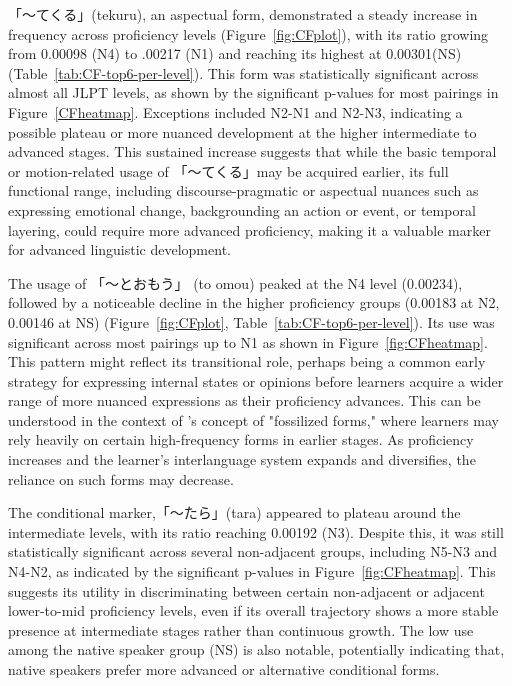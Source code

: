 「〜てくる」(tekuru), an aspectual form, demonstrated a steady increase in frequency across proficiency
levels (Figure~\ref{fig:CFplot}), with its ratio growing from 0.00098 (N4) to .00217 (N1) and reaching
its highest at 0.00301(NS) (Table~\ref{tab:CF-top6-per-level}). This form was
statistically significant across almost all JLPT levels, as shown by the significant p-values for most pairings in
Figure~\ref{CFheatmap}. Exceptions included N2-N1 and N2-N3, indicating a possible plateau or more nuanced
development at the higher intermediate to advanced stages. This sustained increase suggests that while the basic
temporal or motion-related usage of 「〜てくる」may be acquired earlier, its full functional range, including
discourse-pragmatic or aspectual nuances such as expressing emotional change, backgrounding an action or event, or
temporal layering, could require more advanced proficiency, making it a valuable marker for advanced linguistic
development.


The usage of 「〜とおもう」 (to omou) peaked at the N4 level (0.00234), followed by a noticeable decline in the higher
proficiency
groups (0.00183 at N2, 0.00146 at NS) (Figure~\ref{fig:CFplot}, Table~\ref{tab:CF-top6-per-level}). Its
use was
significant across most pairings up to N1 as shown in Figure~\ref{fig:CFheatmap}. This pattern might reflect its
transitional
role, perhaps being a common early strategy for expressing
internal states or
opinions before learners acquire a wider range of more nuanced expressions as their proficiency advances. This can 
be understood in the context of \citet{selinker1972}'s concept of "fossilized forms," where learners may rely heavily
on certain high-frequency forms in earlier stages. As proficiency increases and the learner's interlanguage system
expands and diversifies, the reliance on such forms may decrease.

The conditional marker,「〜たら」(tara) appeared to plateau around the intermediate levels, with its ratio reaching
0.00192 (N3). Despite this, it was still statistically significant across several
non-adjacent
groups, including N5-N3 and
N4-N2,
as indicated by the significant p-values in Figure~\ref{fig:CFheatmap}. This suggests its utility in discriminating
between certain non-adjacent or adjacent lower-to-mid proficiency levels, even if its overall trajectory shows a
more stable presence at intermediate stages rather than continuous growth. The low use among the native speaker
group (NS) is also notable, potentially indicating that, native speakers prefer more advanced or alternative conditional
forms.

